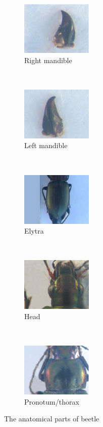 \documentclass{article} %
\begin{document}
\begin{multicols}{2}
\begin{figure}[H]
    \centering
    \begin{subfigure}[t]{0.23\textwidth}
        \centering
        \includegraphics[height=1in]{images/md19.eps}
        \caption{\footnotesize{Right mandible}}
        \label{figsub01}
    \end{subfigure}%
    ~ 
    \begin{subfigure}[t]{0.23\textwidth}
        \centering
        \includegraphics[height=1in]{images/mg019.JPG}
        \caption{\footnotesize{Left mandible}}
        \label{figsub02}
    \end{subfigure}~\\
    \begin{subfigure}[t]{0.23\textwidth}
        \centering
        \includegraphics[height=1in]{images/elytre107.JPG}
        \caption{\footnotesize{Elytra}}
        \label{figsub03}
    \end{subfigure}%
    ~ 
    \begin{subfigure}[t]{0.23\textwidth}
        \centering
        \includegraphics[height=1in]{images/tete081.JPG}
        \caption{\footnotesize{Head}}
        \label{figsub04}
    \end{subfigure}~\\
    \begin{subfigure}[t]{0.23\textwidth}
        \centering
        \includegraphics[height=1in]{images/prono60.eps}
        \caption{\footnotesize{Pronotum/thorax}}
        \label{figsub05}
    \end{subfigure}
    \caption{\footnotesize{The anatomical parts of beetle}}
    \label{fig1}
\end{figure}


\end{multicols}
\end{document}
